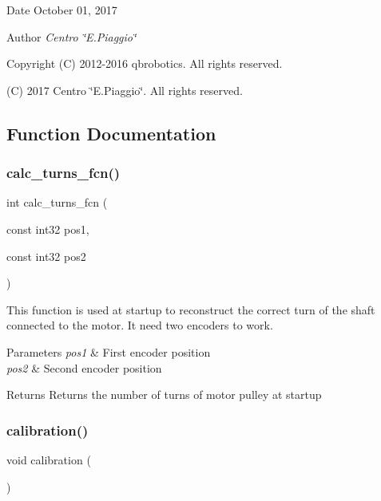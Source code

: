 \begin{DoxyDate}{Date}
October 01, 2017 
\end{DoxyDate}
\begin{DoxyAuthor}{Author}
{\itshape Centro \char`\"{}\+E.\+Piaggio\char`\"{}} 
\end{DoxyAuthor}
\begin{DoxyCopyright}{Copyright}
(C) 2012-\/2016 qbrobotics. All rights reserved. 

(C) 2017 Centro \char`\"{}\+E.\+Piaggio\char`\"{}. All rights reserved. 
\end{DoxyCopyright}


\subsection{Function Documentation}
\mbox{\label{utils_8c_afa68f255d25478e463690f63d529c29d}} 
\subsubsection{calc\+\_\+turns\+\_\+fcn()}
{\footnotesize\ttfamily int calc\+\_\+turns\+\_\+fcn (\begin{DoxyParamCaption}\item[{const int32}]{pos1,  }\item[{const int32}]{pos2 }\end{DoxyParamCaption})}

This function is used at startup to reconstruct the correct turn of the shaft connected to the motor. It need two encoders to work.


\begin{DoxyParams}{Parameters}
{\em pos1} & First encoder position \\
\hline
{\em pos2} & Second encoder position\\
\hline
\end{DoxyParams}
\begin{DoxyReturn}{Returns}
Returns the number of turns of motor pulley at startup 
\end{DoxyReturn}
\mbox{\label{utils_8c_a0b6a0b24c6bd8af032a6778166201f7e}} 
\subsubsection{calibration()}
{\footnotesize\ttfamily void calibration (\begin{DoxyParamCaption}{ }\end{DoxyParamCaption})}


